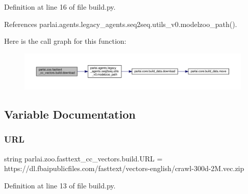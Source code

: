 Definition at line 16 of file build.\+py.



References parlai.\+agents.\+legacy\+\_\+agents.\+seq2seq.\+utils\+\_\+v0.\+modelzoo\+\_\+path().

Here is the call graph for this function\+:
\nopagebreak
\begin{figure}[H]
\begin{center}
\leavevmode
\includegraphics[width=350pt]{namespaceparlai_1_1zoo_1_1fasttext__cc__vectors_1_1build_a493e8ecb82f7444a1eee020a8dd620ce_cgraph}
\end{center}
\end{figure}


\subsection{Variable Documentation}
\mbox{\label{namespaceparlai_1_1zoo_1_1fasttext__cc__vectors_1_1build_af27fa9f3a3f59eac5ae47c12f462ce5f}} 
\subsubsection{\texorpdfstring{U\+RL}{URL}}
{\footnotesize\ttfamily string parlai.\+zoo.\+fasttext\+\_\+cc\+\_\+vectors.\+build.\+U\+RL = \textquotesingle{}https\+://dl.\+fbaipublicfiles.\+com/fasttext/vectors-\/english/crawl-\/300d-\/2\+M.\+vec.\+zip\textquotesingle{}}



Definition at line 13 of file build.\+py.

